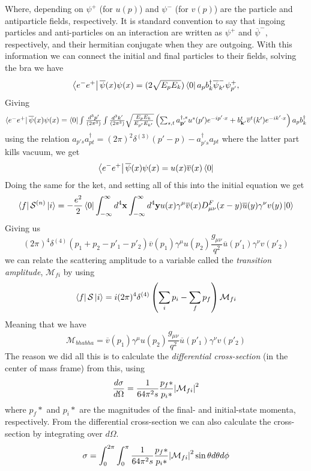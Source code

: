 \documentclass[12pt, a4paper]{book}
\begin{document}
Where, depending on $\psi^+$ (for $u(p)$) and $\psi^-$ (for $v(p)$) are the particle and antiparticle fields, respectively. It is standard convention to say that ingoing particles and anti-particles 
on an interaction are written as $\psi^+$ and $\overline{\psi}^-$, respectively, and their hermitian conjugate when they are outgoing. With this information we can connect the initial and final particles to their fields, solving the bra we have
$$
\bra{e^-e^+}\overline{\psi}(x)\psi(x) = (2\sqrt{E_pE_k})\bra{0}a_{p}b^\dagger_{k}\overline{\psi}^-_{k'}\psi^+_{p'},
$$
Giving
$$
\textstyle\bra{e^-e^+}\overline{\psi}(x)\psi(x) = \bra{0} \int\frac{d^3p'}{(2\pi^3)}\int\frac{d^3k'}{(2\pi^3)}\sqrt{\frac{E_pE_k}{E_{p'}E_{k'}}} \left(\sum_{s,t}a^{\dagger,s}_\mathbf{p'}u^s(p')e^{-ip'\cdot x} + b^{t}_\mathbf{k'}\overline{v}^t(k')e^{-ik'\cdot x}\right)a_{p}b^\dagger_{k}
$$
using the relation $a_{p's}a_{pt}^\dagger = (2\pi)^2\delta^{(3)}(p'-p)- a_{p's}^\dagger a_{pt}$ where the latter part kills vacuum, we get
$$
\bra{e^-e^+}\overline{\psi}(x)\psi(x) = u(x)\overline{v}(x)\bra{0}
$$
Doing the same for the ket, and setting all of this into the initial equation we get
$$
\bra{f}\mathcal{S}^{(n)}\ket{i} = -\frac{e^2}{2}\bra{0}\int_{-\infty}^{\infty}d^4\mathbf{x} \int_{-\infty}^{\infty}d^4\mathbf{y} u(x)\gamma^\mu\overline{v}(x)D_{\mu\nu}^F(x-y)\overline{u}(y)\gamma^\nu v(y)\ket{0}
$$
Giving us
$$
(2\pi)^4\delta^{(4)}(p_1+p_2-p'_1-p'_2)\overline{v}(p_1)\gamma^\mu u(p_2) \frac{g_{\mu\nu}}{q^2}\overline{u}(p'_1)\gamma^\nu v(p'_2)
$$
we can relate the scattering amplitude to a variable called the \textit{transition amplitude}, $\mathcal{M}_{fi}$ by using 
$$
\bra{f}\mathcal{S}\ket{i} = i(2\pi)^4\delta^{(4)}\left(\sum_i p_i -\sum_f p_f\right)\mathcal{M}_{fi}
$$
Meaning that we have
$$
\mathcal{M}_{bhabha} = \overline{v}(p_1)\gamma^\mu u(p_2) \frac{g_{\mu\nu}}{q^2}\overline{u}(p'_1)\gamma^\nu v(p'_2)
$$
The reason we did all this is to calculate the \textit{differential cross-section} (in the center of mass frame) from this, using
\begin{equation}\label{eq:diff_cross}
    \frac{d\sigma}{d\Omega} = \frac{1}{64\pi^2s}\frac{p_f*}{p_i*}\abs{\mathcal{M}_{fi}}^2
\end{equation}
where $p_f*$ and $p_i*$ are the magnitudes of the final- and initial-state momenta, respectively. From the differential cross-section we can also calculate the cross-section by integrating over $d\Omega$. 
\begin{equation}\label{eq:cross_sec}
    \sigma = \int_{0}^{2\pi}\int_{0}^{\pi}\frac{1}{64\pi^2s}\frac{p_f*}{p_i*}\abs{\mathcal{M}_{fi}}^2 \sin\theta d\theta d\phi
\end{equation}
\end{document}
